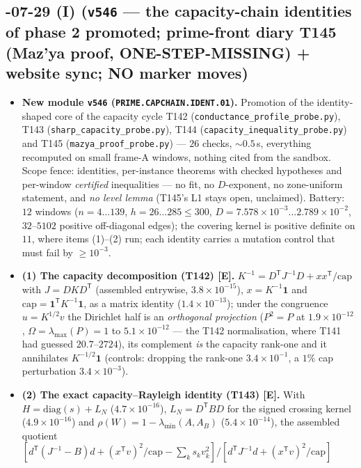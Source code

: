 \documentclass[11pt]{article}
\providecommand{\mE}{\textbf{[E]}}\providecommand{\mC}{\textbf{[C]}}
\begin{document}
\subsection*{-07-29 (I) (\texttt{v546} --- the capacity-chain identities of phase 2 promoted; prime-front diary T145 (Maz'ya proof, ONE-STEP-MISSING) + website sync; NO marker moves)}
\begin{itemize}[leftmargin=1.5em]
\item \textbf{New module \texttt{v546} (\texttt{PRIME.CAPCHAIN.IDENT.01}).} Promotion of the
identity-shaped core of the capacity cycle T142 (\texttt{conductance\_profile\_probe.py}), T143
(\texttt{sharp\_capacity\_probe.py}), T144 (\texttt{capacity\_inequality\_probe.py}) and T145
(\texttt{mazya\_proof\_probe.py}) --- $26$ checks, ${\sim}0.5$\,s, everything recomputed on small
frame-A windows, nothing cited from the sandbox. Scope fence: identities, per-instance theorems with
checked hypotheses and per-window \emph{certified} inequalities --- no fit, no $D$-exponent, no
zone-uniform statement, and \emph{no level lemma} (T145's L1 stays open, unclaimed). Battery: $12$
windows ($n=4\ldots139$, $h=26\ldots285\le300$, $D=7.578\times10^{-3}\ldots2.789\times10^{-2}$,
$32$--$5102$ positive off-diagonal edges); the covering kernel is positive definite on $11$, where
items (1)--(2) run; each identity carries a mutation control that must fail by $\ge10^{-3}$.
\item \textbf{(1) The capacity decomposition (T142) \mE.}
$K^{-1}=D^{\mathsf T}J^{-1}D+xx^{\mathsf T}/\mathrm{cap}$ with $J=DKD^{\mathsf T}$ (assembled
entrywise, $3.8\times10^{-15}$), $x=K^{-1}\mathbf 1$ and
$\mathrm{cap}=\mathbf 1^{\mathsf T}K^{-1}\mathbf 1$, as a matrix identity ($1.4\times10^{-13}$);
under the congruence $u=K^{1/2}v$ the Dirichlet half is an \emph{orthogonal projection}
($P^2=P$ at $1.9\times10^{-12}$, $\Omega=\lambda_{\max}(P)=1$ to $5.1\times10^{-12}$ --- the T142
normalisation, where T141 had guessed $20.7$--$2724$), its complement \emph{is} the capacity
rank-one and it annihilates $K^{-1/2}\mathbf 1$ (controls: dropping the rank-one $3.4\times10^{-1}$,
a $1\%$ cap perturbation $3.4\times10^{-3}$).
\item \textbf{(2) The exact capacity--Rayleigh identity (T143) \mE.} With $H=\mathrm{diag}(s)+L_N$
($4.7\times10^{-16}$), $L_N=D^{\mathsf T}BD$ for the signed crossing kernel ($4.9\times10^{-16}$)
and $\rho(W)=1-\lambda_{\min}(A,A_B)$ ($5.4\times10^{-14}$), the assembled quotient
$[d^{\mathsf T}(J^{-1}-B)d+(x^{\mathsf T}v)^2/\mathrm{cap}-\sum_ks_kv_k^2]/[d^{\mathsf T}J^{-1}d+(x^{\mathsf T}v)^2/\mathrm{cap}]$

\end{itemize}
\end{document}
